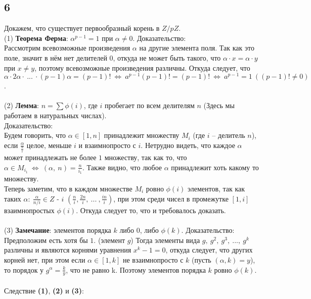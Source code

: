 		\subsection{6}
		Докажем, что существует первообразный корень в $Z/pZ$.\\
		(1) \textbf{Теорема Ферма}: $\alpha^{p-1} = 1$ при $\alpha \ne 0$. Доказательство:\\
		Рассмотрим всевозможные произведения $\alpha$ на другие элемента поля. Так как это поле, значит в нём нет делителей $0$, откуда не может быть такого, что $\alpha \cdot x = \alpha \cdot y$ при $x \ne y$, поэтому всевозможные произведения различны. Откуда следует, что $\alpha \cdot 2\alpha \cdot \: ... \: \cdot (p-1)\alpha = (p-1)!  \ \Leftrightarrow \  a^{p-1}(p-1)! = (p-1)!  \ \Leftrightarrow \  a^{p-1} = 1 \ ((p-1)! \ne 0)$.\\
		\\
		(2) \textbf{Лемма}: $n = \sum \phi (i)$, где $i$ пробегает по всем делителям $n$ (Здесь мы работаем в натуральных числах).\\
		Доказательство:\\
		Будем говорить, что $\alpha \in [1,n]$ принадлежит множеству $M_i$ (где $i$ -- делитель $n$), если $\frac{\alpha}{\frac{n}{i}}$ целое, меньше $i$ и взаимнопросто с $i$. Нетрудно видеть, что каждое $\alpha$ может принадлежать не более $1$ множеству, так как то, что $\alpha \in M_{i_1} \ \Leftrightarrow \ (\alpha,\ n) = \frac{n}{i_1}$. Также видно, что любое $\alpha$ принадлежит хоть какому то множеству.\\ 
		Теперь заметим, что в каждом множестве $M_i$ ровно $\phi(i)$ элементов, так как таких $\alpha:\ \frac{\alpha}{n/i} \in Z$ - $i$ $(\frac{n}{i}, \frac{2n}{i},\ ... \: , \frac{in}{i})$, при этом среди чисел в промежутке $[1,i]$ взаимнопростых $\phi(i)$. Откуда следует то, что и требовалось доказать.\\
		\\
		(3) \textbf{Замечание}: элементов порядка $k$ либо $0$, либо $\phi(k)$. Доказательство:\\
		Предположим есть хотя бы $1$. (элемент $g$) Тогда элементы вида $g,\ g^2,\ g^3,\ ... ,\ g^k$ различны и являются корнями уравнения $x^k - 1 = 0$, откуда следует, что других корней нет, при этом если $\alpha \in [1,k]$ не взаимнопросто с $k$ (пусть $(\alpha,k) = y$), то порядок у $g^{\alpha} = \frac{k}{y}$, что не равно k. Поэтому элементов порядка $k$ ровно $\phi(k)$.\\
		\\
		Следствие \textbf{(1)}, \textbf{(2)} и \textbf{(3)}:\\
